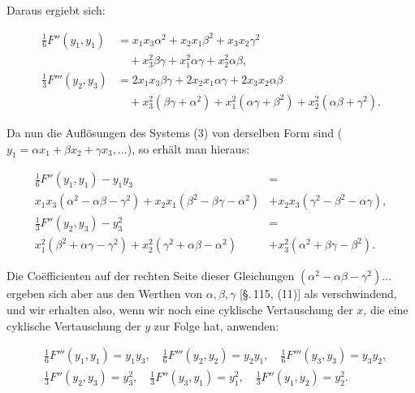 
Daraus ergiebt sich:

\[
\begin{aligned}
\tfrac{1}{6} F''(y_1, y_1) &= x_1 x_3 \alpha^2 + x_2 x_1 \beta^2 + x_3 x_2 \gamma^2 \\
&\quad + x_3^2 \beta\gamma + x_1^2 \alpha\gamma + x_2^2 \alpha\beta, \\
\tfrac{1}{3} F'''(y_2, y_3) &= 2x_1 x_3 \beta\gamma + 2x_2 x_1 \alpha\gamma + 2x_3 x_2 \alpha\beta \\
&\quad + x_3^2 (\beta\gamma + \alpha^2) + x_1^2 (\alpha\gamma + \beta^2) + x_2^2 (\alpha\beta + \gamma^2).
\end{aligned}
\]

Da nun die Auflösungen des Systems (3) von derselben Form sind ($y_1 = \alpha x_1 + \beta x_2 + \gamma x_3, \dots$), so erhält man hieraus:

\[
\begin{aligned}
\tfrac{1}{6} F''(y_1, y_1) - y_1 y_3 &= \\
x_1 x_3 (\alpha^2 - \alpha\beta - \gamma^2) + x_2 x_1 (\beta^2 - \beta\gamma - \alpha^2) &+ x_2 x_3 (\gamma^2 - \beta^2 - \alpha\gamma), \\
\tfrac{1}{3} F''(y_2, y_3) - y_3^2 &= \\
x_1^2 (\beta^2 + \alpha\gamma - \gamma^2) + x_2^2 (\gamma^2 + \alpha\beta - \alpha^2) &+ x_3^2 (\alpha^2 + \beta\gamma - \beta^2).
\end{aligned}
\]

Die Coëfficienten auf der rechten Seite dieser Gleichungen $(\alpha^2 - \alpha\beta - \gamma^2) \dots$ ergeben sich aber aus den Werthen von $\alpha, \beta, \gamma$ [\S.\,115, (11)] als verschwindend, und wir erhalten also, wenn wir noch eine cyklische Vertauschung der $x$, die eine cyklische Vertauschung der $y$ zur Folge hat, anwenden:

\[
\begin{aligned}
&\tfrac{1}{6} F'''(y_1, y_1) = y_1 y_3, \quad \tfrac{1}{6} F'''(y_2, y_2) = y_2 y_1, \quad \tfrac{1}{6} F'''(y_3, y_3) = y_3 y_2, \\
&\tfrac{1}{3} F''(y_2, y_3) = y_3^2, \quad \tfrac{1}{3} F''(y_3, y_1) = y_1^2, \quad \tfrac{1}{3} F''(y_1, y_2) = y_2^2.
\end{aligned}
\]

